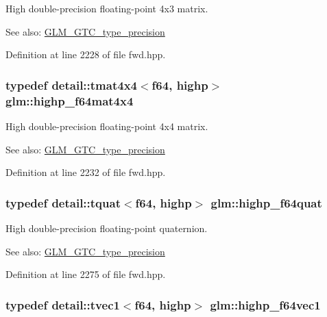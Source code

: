 High double-precision floating-point 4x3 matrix. \begin{Desc}
\item[See also:]\hyperlink{group__gtc__type__precision}{GLM\_\-GTC\_\-type\_\-precision} \end{Desc}


Definition at line 2228 of file fwd.hpp.\hypertarget{group__gtc__type__precision_ga95b52552df369b75d09155ebb29b1bd}{
\subsubsection[highp\_\-f64mat4x4]{\setlength{\rightskip}{0pt plus 5cm}typedef detail::tmat4x4$<$f64, highp$>$ {\bf glm::highp\_\-f64mat4x4}}}
\label{group__gtc__type__precision_ga95b52552df369b75d09155ebb29b1bd}


High double-precision floating-point 4x4 matrix. \begin{Desc}
\item[See also:]\hyperlink{group__gtc__type__precision}{GLM\_\-GTC\_\-type\_\-precision} \end{Desc}


Definition at line 2232 of file fwd.hpp.\hypertarget{group__gtc__type__precision_g9372e8b60f401fd94aba637b3ed17cfc}{
\subsubsection[highp\_\-f64quat]{\setlength{\rightskip}{0pt plus 5cm}typedef detail::tquat$<$f64, highp$>$ {\bf glm::highp\_\-f64quat}}}
\label{group__gtc__type__precision_g9372e8b60f401fd94aba637b3ed17cfc}


High double-precision floating-point quaternion. \begin{Desc}
\item[See also:]\hyperlink{group__gtc__type__precision}{GLM\_\-GTC\_\-type\_\-precision} \end{Desc}


Definition at line 2275 of file fwd.hpp.\hypertarget{group__gtc__type__precision_g1054b4e4da2b907b35e1806bd6fbaef1}{
\subsubsection[highp\_\-f64vec1]{\setlength{\rightskip}{0pt plus 5cm}typedef detail::tvec1$<$f64, highp$>$ {\bf glm::highp\_\-f64vec1}}}
\label{group__gtc__type__precision_g1054b4e4da2b907b35e1806bd6fbaef1}


